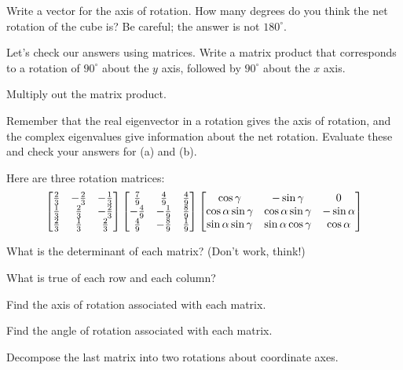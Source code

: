 \documentclass[../gatm_answers.tex]{subfiles}
\begin{document}
\begin{inner_problem}
\item Write a vector for the axis of rotation. How many degrees do you think the net rotation of the cube is? Be careful; the answer is not $180^\circ$.
\end{inner_problem}

\begin{inner_problem}
\item Let's check our answers using matrices. Write a matrix product that corresponds to a rotation of $90^\circ$ about the $y$ axis, followed by $90^\circ$ about the $x$ axis.
\end{inner_problem}

\begin{inner_problem}
\item Multiply out the matrix product.
\end{inner_problem}

\begin{inner_problem}
\item Remember that the real eigenvector in a rotation gives the axis of rotation, and the complex eigenvalues give information about the net rotation. Evaluate these and check your answers for (a) and (b).
\end{inner_problem}

\begin{outer_problem}
\item Here are three rotation matrices:
$$\begin{bmatrix} \frac{2}{3} & -\frac{2}{3} & -\frac{1}{3} \\ \frac{1}{3} & \frac{2}{3} & -\frac{2}{3} \\ \frac{2}{3} & \frac{1}{3} & \frac{2}{3} \end{bmatrix}
\begin{bmatrix} \frac{7}{9} & \frac{4}{9} & \frac{4}{9} \\ -\frac{4}{9} & -\frac{1}{9} & \frac{8}{9} \\ \frac{4}{9} & -\frac{8}{9} & \frac{1}{9} \end{bmatrix}
\begin{bmatrix} \cos\gamma & -\sin\gamma & 0 \\ \cos\alpha\sin\gamma & \cos\alpha\sin\gamma & -\sin\alpha \\ \sin\alpha\sin\gamma & \sin\alpha\cos\gamma & \cos\alpha \end{bmatrix}$$
\end{outer_problem}

\begin{inner_problem}[start=1]
\item What is the determinant of each matrix? (Don't work, think!)
\end{inner_problem}

\begin{inner_problem}
\item What is true of each row and each column?
\end{inner_problem}

\begin{inner_problem}
\item Find the axis of rotation associated with each matrix.
\end{inner_problem}

\begin{inner_problem}
\item Find the angle of rotation associated with each matrix.
\end{inner_problem}

\begin{inner_problem}
\item Decompose the last matrix into two rotations about coordinate axes.
\end{inner_problem}
\end{document}
